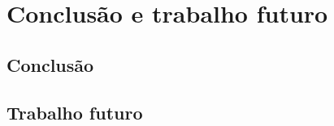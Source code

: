 \chapter{Conclusão e trabalho futuro}


\section{Conclusão}

\section{Trabalho futuro}

\cite{tese1}